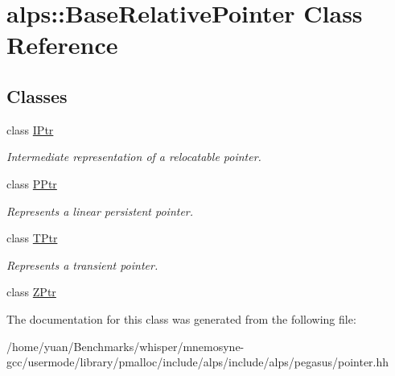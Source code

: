 \hypertarget{classalps_1_1BaseRelativePointer}{}\section{alps\+:\+:Base\+Relative\+Pointer Class Reference}
\label{classalps_1_1BaseRelativePointer}
\subsection*{Classes}
\begin{DoxyCompactItemize}
\item 
class \hyperlink{classalps_1_1BaseRelativePointer_1_1IPtr}{I\+Ptr}
\begin{DoxyCompactList}\small\item\em Intermediate representation of a relocatable pointer. \end{DoxyCompactList}\item 
class \hyperlink{classalps_1_1BaseRelativePointer_1_1PPtr}{P\+Ptr}
\begin{DoxyCompactList}\small\item\em Represents a linear persistent pointer. \end{DoxyCompactList}\item 
class \hyperlink{classalps_1_1BaseRelativePointer_1_1TPtr}{T\+Ptr}
\begin{DoxyCompactList}\small\item\em Represents a transient pointer. \end{DoxyCompactList}\item 
class \hyperlink{classalps_1_1BaseRelativePointer_1_1ZPtr}{Z\+Ptr}
\end{DoxyCompactItemize}


The documentation for this class was generated from the following file\+:\begin{DoxyCompactItemize}
\item 
/home/yuan/\+Benchmarks/whisper/mnemosyne-\/gcc/usermode/library/pmalloc/include/alps/include/alps/pegasus/pointer.\+hh\end{DoxyCompactItemize}
